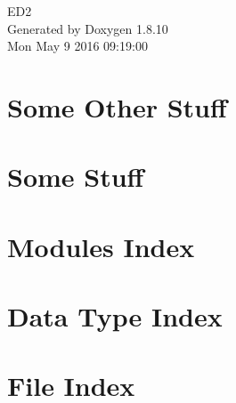 \documentclass[twoside]{book}
\newcommand{\+}{\discretionary{\mbox{\scriptsize$\hookleftarrow$}}{}{}}
\newcommand{\clearemptydoublepage}{%
  \newpage{\pagestyle{empty}\cleardoublepage}%
}
\begin{document}
\hypersetup{pageanchor=false,
             bookmarks=true,
             bookmarksnumbered=true,
             pdfencoding=unicode
            }
\begin{titlepage}
\vspace*{7cm}
\begin{center}%
{\Large E\+D2 }\\
\vspace*{1cm}
{\large Generated by Doxygen 1.8.10}\\
\vspace*{0.5cm}
{\small Mon May 9 2016 09:19:00}\\
\end{center}
\end{titlepage}
\clearemptydoublepage
\tableofcontents
\clearemptydoublepage
{}
\hypersetup{pageanchor=true}

\chapter{Some Other Stuff}
\label{md__doc_custom__some__other__stuff}
\hypertarget{md__doc_custom__some__other__stuff}{}

\chapter{Some Stuff}
\label{md__doc_custom__some__stuff}
\hypertarget{md__doc_custom__some__stuff}{}

\chapter{Modules Index}

\chapter{Data Type Index}

\chapter{File Index}

\end{document}
